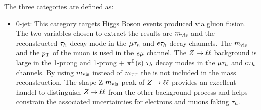 The three categories are defined as:
\begin{itemize}
\item {0-jet}: This category targets Higgs Boson events produced via gluon fusion.
The two variables chosen to extract the results are $m_\text{vis}$ and
the reconstructed $\tau_{h}$ decay mode in the $\mu\tau_{h}$ and $e\tau_{h}$ decay channels.
The $m_\text{vis}$ and the $p_\mathrm{T}$ of the muon is used in the $e\mu$ channel.  The $Z\to\ell\ell$ background 
is large in the 1-prong and 1-prong + $\pi^{0}$(s) $\tau_{h}$ decay modes in the
$\mu\tau_{h}$ and $e\tau_{h}$ channels.  By using $m_\text{vis}$ instead of $m_{\tau\tau}$ the \etvecmiss
is not included in the mass reconstruction.  The shape Z $m_\text{vis}$ peak of $Z\to\ell\ell$ provides 
an excellent handel to distinguish $Z\to\ell\ell$ from the other background process and
helps constrain the associated uncertainties for electrons and muons faking $\tau_{h}$.



\end{itemize}
